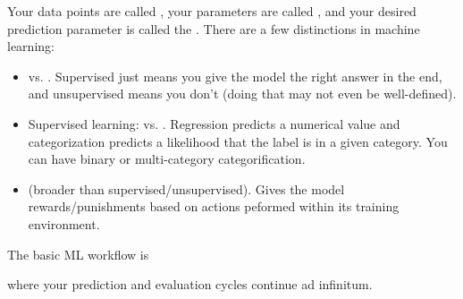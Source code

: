 \documentclass[11pt]{article}
\begin{document}
\begin{iidea}
    Your data points are called
    , your parameters are called ,
    and your desired prediction parameter is called the .
    There are a few distinctions in machine learning:
    \begin{itemize}
        \item {} vs. . Supervised
        just means you give the model the right answer in the end,
        and unsupervised means you don't (doing that may not even be well-defined).
        \item Supervised learning:  vs. .
        Regression predicts a numerical value and categorization predicts
        a likelihood that the label is in a given category. You can have binary
        or multi-category categorification.
        \item {} (broader than supervised/unsupervised).
        Gives the model rewards/punishments based on actions peformed within
        its training environment.
    \end{itemize}
    The basic ML workflow is
    \begin{center}
    \end{center}
    where your prediction and evaluation cycles continue ad infinitum.
\end{iidea}
\end{document}
